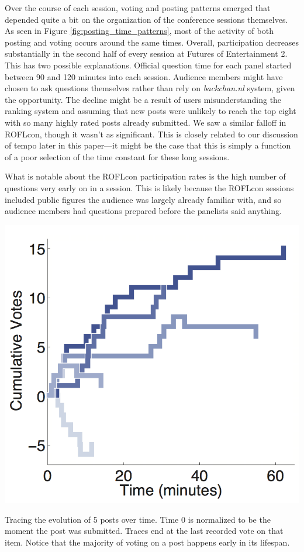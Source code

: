 Over the course of each session, voting and posting patterns emerged that depended quite a bit on the organization of the conference sessions themselves. As seen in Figure \ref{fig:posting_time_patterns}, most of the activity of both posting and voting occurs around the same times. Overall, participation decreases substantially in the second half of every session at Futures of Entertainment 2. This has two possible explanations. Official question time for each panel started between 90 and 120 minutes into each session. Audience members might have chosen to ask questions themselves rather than rely on \emph{backchan.nl} system, given the opportunity. The decline might be a result of users misunderstanding the ranking system and assuming that new posts were unlikely to reach the top eight with so many highly rated posts already submitted. We saw a similar falloff in ROFLcon, though it wasn't as significant. This is closely related to our discussion of tempo later in this paper---it might be the case that this is simply a function of a poor selection of the time constant for these long sessions. 

What is notable about the ROFLcon participation rates is the high number of questions very early on in a session. This is likely because the ROFLcon sessions included public figures the audience was largely already familiar with, and so audience members had questions prepared before the panelists said anything.

\begin{marginfigure}
	\includegraphics{figures/backchannl/cumulative_vote_histories_colors.png}
	\caption{Tracing the evolution of 5 posts over time. Time 0 is normalized to be the moment the post was submitted. Traces end at the last recorded vote on that item. Notice that the majority of voting on a post happens early in its lifespan.}
	\label{fig:post_score_evolution}
\end{marginfigure}

